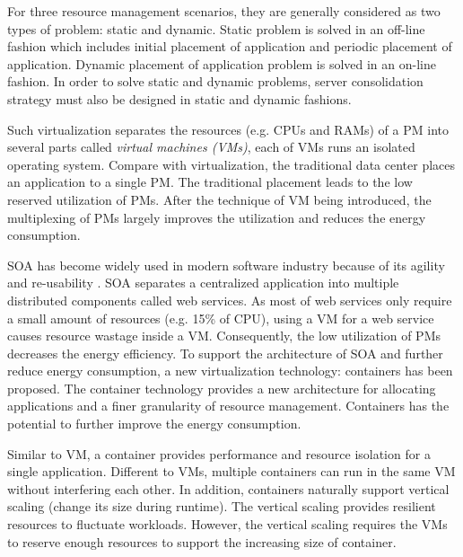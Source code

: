  For three resource management scenarios, they are generally considered as two types of problem: static and dynamic. Static problem is solved in an off-line fashion which includes initial placement of application and periodic placement of application. Dynamic placement of application problem is solved in an on-line fashion. In order to solve static and dynamic problems, server consolidation strategy must also be designed in static and dynamic fashions. 


 Such virtualization separates the resources (e.g. CPUs and RAMs) of a PM into several parts called \emph{virtual machines (VMs)}, each of VMs runs an isolated operating system. Compare with virtualization, the traditional data center places an application to a single PM. The traditional placement leads to the low reserved utilization of PMs. After the technique of VM being introduced, the multiplexing of PMs largely improves the utilization and reduces the energy consumption. 

 SOA has become widely used in modern software industry because of its agility and re-usability \cite{Sprott:2004wt}. SOA separates a centralized application into multiple distributed components called web services. As most of web services only require a small amount of resources (e.g. 15\% of CPU),  using a VM for a web service causes resource wastage inside a VM. Consequently, the low utilization of PMs decreases the energy efficiency. To support the architecture of SOA and further reduce energy consumption, a new virtualization technology: containers \cite{Felter:2015ki, Soltesz:2007cu} has been proposed. The container technology provides a new architecture for allocating applications and a finer granularity of resource management. Containers has the potential to further improve the energy consumption.

 Similar to VM, a container provides performance and resource isolation for a single application. Different to VMs, multiple containers can run in the same VM without interfering each other. In addition, containers naturally support vertical scaling (change its size during runtime)\cite{Vaquero:2011gb}. The vertical scaling provides resilient resources to fluctuate workloads. However, the vertical scaling requires the VMs to reserve enough resources to support the increasing size of container.

